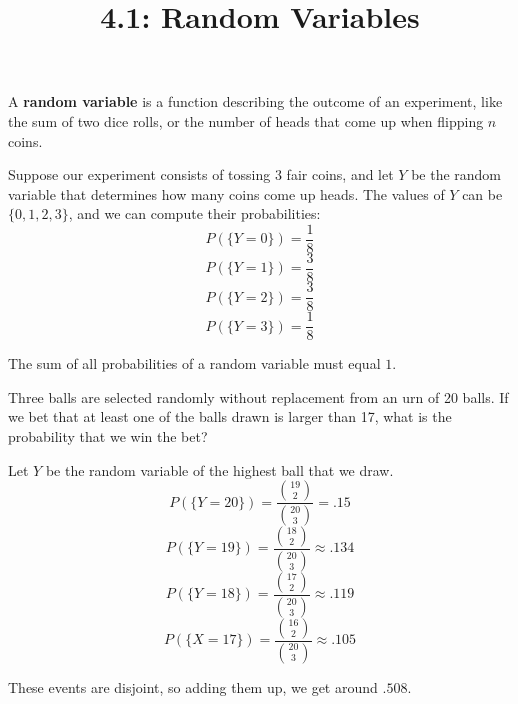 \documentclass{article}
\title{4.1: Random Variables}
\begin{document}
\maketitle
\begin{definition}
A \textbf{random variable} is a function describing the outcome of an experiment, like the sum of two dice rolls, or the number of heads that come up when flipping $n$ coins. 
\end{definition}
\begin{example}
Suppose our experiment consists of tossing $3$ fair coins, and let $Y$ be the random variable that determines how many coins come up heads. The values of $Y$ can be $\{0,1,2,3\}$, and we can compute their probabilities: $$P(\{Y = 0\}) = \frac{1}{8}$$$$P(\{Y = 1\}) = \frac{3}{8}$$$$P(\{Y=2\}) = \frac{3}{8}$$$$P(\{Y=3\}) = \frac{1}{8}$$
\end{example}
The sum of all probabilities of a random variable must equal $1$. 

\begin{example}
Three balls are selected randomly without replacement from an urn of 20 balls. If we bet that at least one of the balls drawn is larger than 17, what is the probability that we win the bet?
\end{example}

\begin{solution}
Let $Y$ be the random variable of the highest ball that we draw. $$P(\{Y = 20\}) = \frac{\binom{19}{2}}{\binom{20}{3}} = .15$$$$P(\{Y = 19 \}) = \frac{\binom{18}{2}}{\binom{20}{3}} \approx .134$$ $$P(\{Y = 18\}) = \frac{\binom{17}{2}}{\binom{20}{3}} \approx .119$$ $$P(\{X=17\}) = \frac{\binom{16}{2}}{\binom{20}{3}}\approx .105$$

These events are disjoint, so adding them up, we get around $.508$.
\end{solution}
\end{document}
